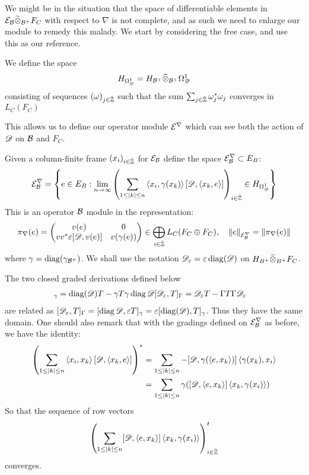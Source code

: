 We might be in the situation that the space of differentiable elements in $\mathcal{E}_{\mathcal{B}}\widetilde{\otimes}_{\mathcal{B}^+} F_C$ with respect to $\nabla$ is not complete, and as such we need to enlarge our module to remedy this malady. We start by considering the free case, and use this as our reference. 
\begin{definition}
	We define the space 
	\begin{align*}
		H_{\Omega^1_{\mathscr{D}}}=H_{\mathcal{B}^+}\widetilde{\otimes}_{\mathcal{B}^+} \Omega^1_{\mathscr{D}}
	\end{align*}
	consisting of sequences $(\omega)_{j\in \hat{\mathbb{Z}}}$ such that the sum $\sum_{j \in \hat{\mathbb{Z}}} \omega_j^*\omega_j$ converges in $L_C(F_C)$
\end{definition}
This allows us to define our operator module $\mathcal{E}^\nabla$ which can see both the action of $\mathscr{D}$ on $\mathcal{B}$ and $F_C$.
\begin{definition}
	Given a column-finite frame $(x_i)_{i\in \hat{\mathbb{Z}}}$ for $\mathcal{E}_{\mathcal{B}}$ define the space $\mathcal{E}^\nabla_{\mathcal{B}}\subset E_B$: 
	\begin{align*}
		\mathcal{E}^\nabla_{\mathcal{B}}=\left \{e\in E_B : \lim_{n\to \infty} \left ( \sum_{1\leq |k| \leq n} \left \langle x_i,\gamma(x_k) \right \rangle[\mathscr{D},\left \langle x_k,e \right \rangle] \right )_{i\in \hat{\mathbb{Z}}} \in H_{\Omega^1_{\mathscr{D}}}\right \}
	\end{align*}
	This is an operator $\mathcal{B}$ module in the representation: 
	\begin{align*}
		\pi_\nabla(e)=\begin{pmatrix} v(e) & 0 \\ vv^*\varepsilon[\mathscr{D},v(e)] & v(\gamma(e)) \end{pmatrix} \in \bigoplus_{i\in \hat{\mathbb{Z}}} L_C(F_C\oplus F_C), \quad \left \Vert e \right \Vert_{\mathcal{E}^\nabla_{\mathcal{B}}}=\left \Vert \pi_\nabla(e) \right \Vert
	\end{align*}
	where $\gamma=\operatorname{diag}(\gamma_{\mathcal{B}^+})$. We shall use the notation $\mathscr{D}_\varepsilon=\varepsilon \operatorname{diag}(\mathscr{D})$ on $H_{B^+}\widetilde{\otimes}_{B^+} F_C$.   
\end{definition}
\begin{remark}\label{remark36}
	The two closed graded derivations defined below 
	\begin{align*}
		[\diag(\D),T]_\gamma&=\diag(\D)T-\gamma T \gamma \diag \D 
		[\D_\epsilon,T]_\Gamma=\D_\epsilon T-\Gamma T\Gamma \D_\epsilon
	\end{align*}
	are related as $[\mathscr{D}_\varepsilon,T]_\Gamma=[\operatorname{diag} \mathscr{D},\varepsilon T]_\gamma=\varepsilon [\operatorname{diag}(\mathscr{D}),T]_\gamma$. 
	Thus they have the same domain. One should also remark that with the gradings defined on $\mathcal{E}^\nabla_{\mathcal{B}}$ as before, we have the identity:
	\begin{align*}
		\left ( \sum_{1\leq |k| \leq n} \left \langle x_i,x_k \right \rangle[\mathscr{D},\left \langle x_k,e \right \rangle] \right )^*&=\sum_{1\leq |k| \leq n} -[\mathscr{D},\gamma(\left \langle e,x_k \right \rangle)]\left \langle \gamma(x_k),x_i \right \rangle \\
		&=\sum_{1\leq |k| \leq n} \gamma([\mathscr{D},\left \langle e,x_k \right \rangle]\left \langle x_k,\gamma(x_i) \right \rangle)
	\end{align*}
	So that the sequence of row vectors
	\begin{align}
		\left ( \sum_{1\leq |k|\leq n}[\mathscr{D},\left \langle e,x_k \right \rangle]\left \langle x_k,\gamma(x_i) \right \rangle \right )^t_{i\in \hat{\mathbb{Z}}} \label{310}
	\end{align}
	converges.
\end{remark}

